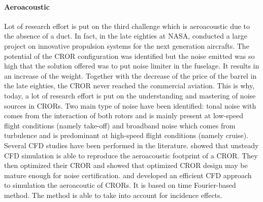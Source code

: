 \paragraph{Aeroacoustic}
Lot of research effort is put on the third challenge which
is aeroacoustic due to the absence of a duct. 
In fact, in the late eighties at NASA, \citet{Hager1988}
conducted a large project on innovative propulsion systems for the
next generation aircrafts. The potential of the CROR configuration
was identified but the noise emitted was so high that the solution
offered was to put noise limiter in the fuselage. It results in 
an increase of the weight. Together with the decrease of the price of the
barrel in the late eighties, the CROR never reached the commercial
aviation. This is why, today, a lot of research effort is put on the
understanding and mastering of noise sources in CRORs.
Two main type of noise have been identified: tonal noise with comes from
the interaction of both rotors and is mainly present at low-speed flight conditions 
(namely take-off)
and broadband noise which comes from turbulence and is predominant
at high-speed flight conditions (namely cruise).
Several CFD studies have been performed in the literature.
\citet{Peters2012} showed that unsteady CFD simulation is able
to reproduce the aeroacoustic footprint of a CROR. They then optimized
their CROR and showed that optimized CROR design may be mature enough
for noise certification. \citet{Hoffer2012} and \citet{Ferrante2013}
developed an efficient CFD approach to simulation the aeroacoutic of CRORs.
It is based on time Fourier-based method. The method is able to
take into account for incidence effects.

